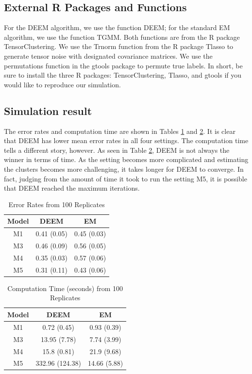 \documentclass[11pt]{article}
\begin{document}
\subsection{External R Packages and Functions}

For the DEEM algorithm, we use the function DEEM; for the standard EM algorithm, we use the function TGMM. Both functions are from the R package TensorClustering. We use the Trnorm function from the R package Tlasso to generate tensor noise with designated covariance matrices. We use the permutations function in the gtools package to permute true labels. In short, be sure to install the three R packages: TensorClustering, Tlasso, and gtools if you would like to reproduce our simulation. 


\subsection{Simulation result}

The error rates and computation time are shown in Tables \ref{tab:err} and \ref{tab:time}. It is clear that DEEM has lower mean error rates in all four settings. The computation time tells a different story, however. As seen in Table \ref{tab:time}, DEEM is not always the winner in terms of time. As the setting becomes more complicated and estimating the clusters becomes more challenging, it takes longer for DEEM to converge. In fact, judging from the amount of time it took to run the setting M5, it is possible that DEEM reached the maximum iterations. 

\begin{table}[ht]
    \centering
    \begin{tabular}{c|cc}
       Model  &  DEEM & EM \\
       \hline
         M1 & 0.41 (0.05) & 0.45 (0.03) \\
         M3 &  0.46 (0.09) & 0.56 (0.05) \\
         M4 &  0.35 (0.03) & 0.57 (0.06) \\ 
         M5 &  0.31 (0.11) & 0.43 (0.06) \\
    \end{tabular}
    \caption{Error Rates from 100 Replicates}
    \label{tab:err}
\end{table}

\begin{table}[ht]
    \centering
    \begin{tabular}{c|cc}
       Model  &  DEEM & EM \\
       \hline
         M1 & 0.72 (0.45) & 0.93 (0.39) \\
         M3 &  13.95 (7.78) & 7.74 (3.99) \\
         M4 &  15.8 (0.81) & 21.9 (9.68) \\ 
         M5 &  332.96 (124.38) & 14.66 (5.88) \\
    \end{tabular}
    \caption{Computation Time (seconds) from 100 Replicates}
    \label{tab:time}
\end{table}
\end{document}
